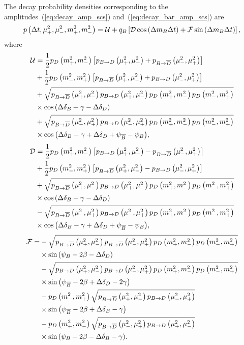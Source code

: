 \documentclass[a4paper,11pt]{article}
\begin{document}
The decay probability densities corresponding to the 
amplitudes~(\ref{eq:decay_amp_scs}) and~(\ref{eq:decay_bar_amp_scs}) are 
\begin{equation}\label{eq:time-pdf-udf}
 p\dtbvardvar = \ucoef + q_B\left[\ccoef\cos{\dmdt} + \scoef\sin{\dmdt}\right],
\end{equation}
where
\begin{equation}\label{eq:ucoef_complete}
 \begin{split}
  \ucoef &= \frac{1}{2} p_D\dvar    \left[ \pbd   \bvar + \pbdbar\bvarinv \right] \\
         &+ \frac{1}{2} p_D\dvarinv \left[ \pbdbar\bvar + \pbd   \bvarinv \right] \\
         &+ \sqrt{\pbdbar\bvar    \pbd\bvar    p_D\dvar p_D\dvarinv} \\
         &\times \cos{\lbr\dbd + \gphi - \deld\rbr} \\
         &+ \sqrt{\pbdbar\bvarinv \pbd\bvarinv p_D\dvar p_D\dvarinv} \\
         &\times \cos{\lbr\dbd - \gphi + \deld + \psibb - \psib\rbr},
 \end{split}
\end{equation}
\begin{equation}\label{eq:ccoef_complete}
 \begin{split}
  \ccoef &= \frac{1}{2} p_D\dvar    \left[ \pbd   \bvar - \pbdbar\bvarinv \right] \\
         &+ \frac{1}{2} p_D\dvarinv \left[ \pbdbar\bvar - \pbd   \bvarinv \right] \\
         &+ \sqrt{\pbdbar\bvar    \pbd\bvar    p_D\dvar p_D\dvarinv} \\
         &\times \cos{\lbr\dbd + \gphi - \deld\rbr} \\
         &- \sqrt{\pbdbar\bvarinv \pbd\bvarinv p_D\dvar p_D\dvarinv} \\
         &\times \cos{\lbr\dbd - \gphi + \deld + \psibb - \psib\rbr},
 \end{split}
\end{equation}
\begin{equation}\label{eq:scoef_complete}
 \begin{split}
  \scoef = &-\sqrt{\pbdbar\bvar \pbdbar\bvarinv p_D\dvar p_D\dvarinv} \\
           &\times \sin{\lbr\psib - 2\pphi - \deld\rbr} \\
           &-\sqrt{\pbd   \bvar \pbd   \bvarinv p_D\dvar p_D\dvarinv} \\
           &\times \sin{\lbr\psibb - 2\pphi + \deld - 2\gphi\rbr} \\
           &-p_D\dvarinv\sqrt{\pbdbar\bvar    \pbd\bvarinv} \\
           &\times \sin{\lbr\psibb - 2\pphi + \dbd - \gphi\rbr} \\
           &-p_D\dvar   \sqrt{\pbdbar\bvarinv \pbd\bvar} \\
           &\times \sin{\lbr\psib  - 2\pphi - \dbd - \gphi\rbr}.
 \end{split}
\end{equation}
\end{document}
